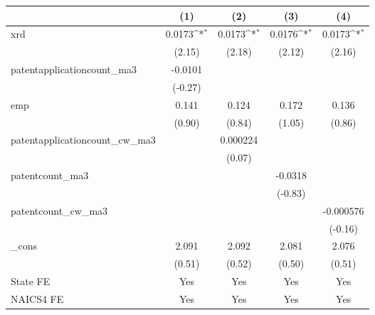 {
\def\sym#1{\ifmmode^{#1}\else\(^{#1}\)\fi}
\begin{tabular}{l*{4}{c}}
\hline\hline
            &\multicolumn{1}{c}{(1)}         &\multicolumn{1}{c}{(2)}         &\multicolumn{1}{c}{(3)}         &\multicolumn{1}{c}{(4)}         \\
\hline
xrd         &      0.0173\sym{*}  &      0.0173\sym{*}  &      0.0176\sym{*}  &      0.0173\sym{*}  \\
            &      (2.15)         &      (2.18)         &      (2.12)         &      (2.16)         \\
[1em]
patentapplicationcount\_ma3&     -0.0101         &                     &                     &                     \\
            &     (-0.27)         &                     &                     &                     \\
[1em]
emp         &       0.141         &       0.124         &       0.172         &       0.136         \\
            &      (0.90)         &      (0.84)         &      (1.05)         &      (0.86)         \\
[1em]
patentapplicationcount\_cw\_ma3&                     &    0.000224         &                     &                     \\
            &                     &      (0.07)         &                     &                     \\
[1em]
patentcount\_ma3&                     &                     &     -0.0318         &                     \\
            &                     &                     &     (-0.83)         &                     \\
[1em]
patentcount\_cw\_ma3&                     &                     &                     &   -0.000576         \\
            &                     &                     &                     &     (-0.16)         \\
[1em]
\_cons      &       2.091         &       2.092         &       2.081         &       2.076         \\
            &      (0.51)         &      (0.52)         &      (0.50)         &      (0.51)         \\
[1em]
State FE    &         Yes         &         Yes         &         Yes         &         Yes         \\
[1em]
NAICS4 FE   &         Yes         &         Yes         &         Yes         &         Yes         \\

\end{tabular}}
